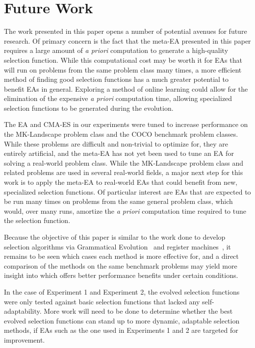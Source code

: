 \documentclass[sigconf]{acmart}
\begin{document}
\section{Future Work}
\label{Future Work}
The work presented in this paper opens a number of potential avenues for future research. Of primary concern is the fact that the meta-EA presented in this paper requires a large amount of \textit{a priori} computation to generate a high-quality selection function. While this computational cost may be worth it for EAs that will run on problems from the same problem class many times, a more efficient method of finding good selection functions has a much greater potential to benefit EAs in general. Exploring a method of online learning could allow for the elimination of the expensive \textit{a priori} computation time, allowing specialized selection functions to be generated during the evolution.

The EA and CMA-ES in our experiments were tuned to increase performance on the MK-Landscape problem class and the COCO benchmark problem classes. While these problems are difficult and non-trivial to optimize for, they are entirely artificial, and the meta-EA has not yet been used to tune an EA for solving a real-world problem class. While the MK-Landscape problem class and related problems are used in several real-world fields, a major next step for this work is to apply the meta-EA to real-world EAs that could benefit from new, specialized selection functions. Of particular interest are EAs that are expected to be run many times on problems from the same general problem class, which would, over many runs, amortize the \textit{a priori} computation time required to tune the selection function.

Because the objective of this paper is similar to the work done to develop selection algorithms via Grammatical Evolution~\citep{lourencco2013selection} and register machines~\citep{woodward2011selection}, it remains to be seen which cases each method is more effective for, and a direct comparison of the methods on the same benchmark problems may yield more insight into which offers better performance benefits under certain conditions.

In the case of Experiment 1 and Experiment 2, the evolved selection functions were only tested against basic selection functions that lacked any self-adaptability. More work will need to be done to determine whether the best evolved selection functions can stand up to more dynamic, adaptable selection methods, if EAs such as the one used in Experiments 1 and 2 are targeted for improvement.
\end{document}
